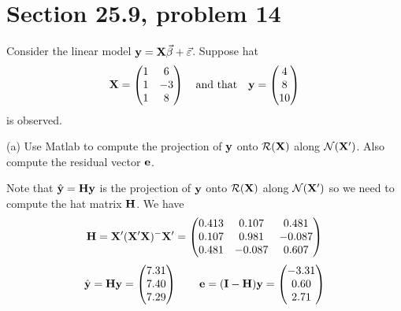 \section{Section 25.9, problem 14}
Consider the linear model ${\bf y}={\bf X}\vec\beta+\vec\varepsilon$.
Suppose hat
$${\bf X}=\left(\begin{matrix}
1 & 6\cr
1 & -3\cr
1 & 8
\end{matrix}\right)\quad\hbox{and that}\quad
{\bf y}=\left(\begin{matrix}
4\cr
8\cr
10
\end{matrix}\right)
$$
is observed.

\bigskip
\noindent
(a) Use Matlab to compute the projection of $\bf y$ onto
${\cal R}({\bf X})$ along ${\cal N}({\bf X}')$.
Also compute the residual vector $\bf e$.

\bigskip
\noindent
Note that $\hat{\mathbf y}=\bf Hy$ is the projection of
$\bf y$ onto ${\cal R}({\bf X})$ along ${\cal N}({\bf X}')$
so we need to compute the hat matrix $\bf H$.
We have
$${\bf H}={\bf X}'({\bf X}'{\bf X})^{-{}}{\bf X}'=\left(\begin{matrix}
0.413 & 0.107 & 0.481\cr
0.107 & 0.981 & -0.087\cr
0.481 & -0.087 & 0.607
\end{matrix}\right)
$$
$$\hat{\bf y}={\bf Hy}=\left(\begin{matrix}
7.31\cr
7.40\cr
7.29
\end{matrix}\right)\qquad
{\bf e}=({\bf I}-{\bf H}){\bf y}=\left(\begin{matrix}
-3.31\cr
0.60\cr
2.71
\end{matrix}\right)
$$

